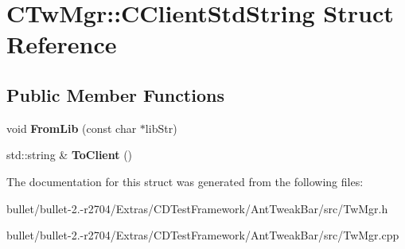 \hypertarget{struct_c_tw_mgr_1_1_c_client_std_string}{\section{C\+Tw\+Mgr\+:\+:C\+Client\+Std\+String Struct Reference}
\label{struct_c_tw_mgr_1_1_c_client_std_string}
}
\subsection*{Public Member Functions}
\begin{DoxyCompactItemize}
\item 
\hypertarget{struct_c_tw_mgr_1_1_c_client_std_string_a4f0bad059ee9bab138d2316b12ead5ce}{void {\bfseries From\+Lib} (const char $\ast$lib\+Str)}\label{struct_c_tw_mgr_1_1_c_client_std_string_a4f0bad059ee9bab138d2316b12ead5ce}

\item 
\hypertarget{struct_c_tw_mgr_1_1_c_client_std_string_ae599aa077ce3c4e89e3488acb6116514}{std\+::string \& {\bfseries To\+Client} ()}\label{struct_c_tw_mgr_1_1_c_client_std_string_ae599aa077ce3c4e89e3488acb6116514}

\end{DoxyCompactItemize}


The documentation for this struct was generated from the following files\+:\begin{DoxyCompactItemize}
\item 
bullet/bullet-\/2.-\/r2704/\+Extras/\+C\+D\+Test\+Framework/\+Ant\+Tweak\+Bar/src/Tw\+Mgr.\+h\item 
bullet/bullet-\/2.-\/r2704/\+Extras/\+C\+D\+Test\+Framework/\+Ant\+Tweak\+Bar/src/Tw\+Mgr.\+cpp\end{DoxyCompactItemize}
